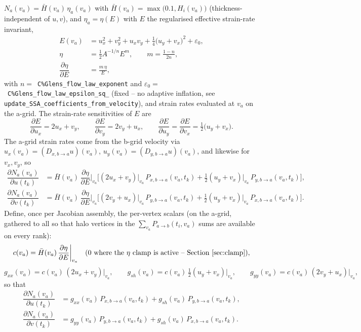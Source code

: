 \documentclass[11pt]{article}
\newcommand{\code}[1]{\texttt{#1}}
\newcommand{\ti}{t_i}
\newcommand{\tk}{t_k}
\newcommand{\va}{v_a}
\newcommand{\pd}[2]{\dfrac{\partial #1}{\partial #2}}
\begin{document}
$N_a(\va) = \bar H(\va)\,\eta_a(\va)$ with $\bar H(\va) = \max\big(0.1,
H_i(\va)\big)$ (thickness-independent of $u,v$), and $\eta_a = \eta(E)$ with
$E$ the regularised effective strain-rate invariant,
\begin{align}
E(\va) &= u_x^2 + v_y^2 + u_x v_y + \tfrac14\big(u_y+v_x\big)^2 + \varepsilon_0, \\
\eta &= \tfrac12 A^{-1/n} E^{m}, \qquad m = \frac{1-n}{2n}, \\
\pd{\eta}{E} &= \frac{m\,\eta}{E},
\end{align}
with $n=$~\code{C\%Glens\_\allowbreak flow\_\allowbreak law\_\allowbreak exponent} and
$\varepsilon_0=$~\code{C\%Glens\_\allowbreak flow\_\allowbreak law\_\allowbreak epsilon\_\allowbreak sq\_\allowbreak 0} (fixed -- no
adaptive inflation, see \code{update\_\allowbreak SSA\_\allowbreak coefficients\_\allowbreak from\_\allowbreak velocity}), and
strain rates evaluated at $\va$ on the a-grid. The strain-rate sensitivities
of $E$ are
\begin{equation}
\pd{E}{u_x} = 2u_x+v_y, \qquad
\pd{E}{v_y} = 2v_y+u_x, \qquad
\pd{E}{u_y} = \pd{E}{v_x} = \tfrac12\big(u_y+v_x\big).
\end{equation}
The a-grid strain rates come from the b-grid velocity via
$u_x(\va) = (D_{x,b\to a}u)(\va)$, $u_y(\va)=(D_{y,b\to a}u)(\va)$, and
likewise for $v_x,v_y$, so
\begin{align}
\pd{N_a(\va)}{u(\tk)} &= \bar H(\va)\,\pd{\eta}{E}\bigg|_{\va}
  \Big[(2u_x+v_y)\big|_{\va}\,P_{x,b\to a}(\va,\tk) + \tfrac12(u_y+v_x)\big|_{\va}\,P_{y,b\to a}(\va,\tk)\Big], \\
\pd{N_a(\va)}{v(\tk)} &= \bar H(\va)\,\pd{\eta}{E}\bigg|_{\va}
  \Big[(2v_y+u_x)\big|_{\va}\,P_{y,b\to a}(\va,\tk) + \tfrac12(u_y+v_x)\big|_{\va}\,P_{x,b\to a}(\va,\tk)\Big].
\end{align}
Define, once per Jacobian assembly, the per-vertex scalars (on the a-grid,
gathered to all so that halo vertices in the $\sum_{\va} P_{a\to b}(\ti,\va)$
sums are available on every rank):
\begin{equation}
c(\va) = \bar H(\va)\,\pd{\eta}{E}\bigg|_{\va}
\quad\text{(0 where the $\eta$ clamp is active -- Section~\ref{sec:clamp})},
\end{equation}
\begin{equation}
g_{xx}(\va) = c(\va)\,(2u_x+v_y)\big|_{\va}, \qquad
g_{sh}(\va) = c(\va)\,\tfrac12(u_y+v_x)\big|_{\va}, \qquad
g_{yy}(\va) = c(\va)\,(2v_y+u_x)\big|_{\va},
\end{equation}
so that
\begin{align}
\pd{N_a(\va)}{u(\tk)} &= g_{xx}(\va)\,P_{x,b\to a}(\va,\tk) + g_{sh}(\va)\,P_{y,b\to a}(\va,\tk), \label{eq:dNa}\\
\pd{N_a(\va)}{v(\tk)} &= g_{yy}(\va)\,P_{y,b\to a}(\va,\tk) + g_{sh}(\va)\,P_{x,b\to a}(\va,\tk).
\end{align}
\end{document}
